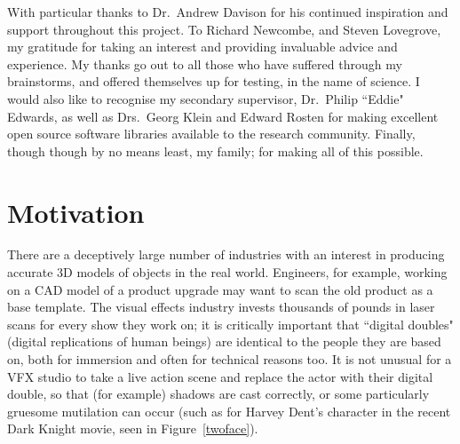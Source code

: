 \documentclass[a4paper,10pt]{article}
\begin{document}
\begin{acknowledgements}
With particular thanks to Dr.\ Andrew Davison for his continued inspiration and support throughout this project. To Richard Newcombe, and Steven Lovegrove, my gratitude for taking an interest and providing invaluable advice and experience. My thanks go out to all those who have suffered through my brainstorms, and offered themselves up for testing, in the name of science. I would also like to recognise my secondary supervisor, Dr.\ Philip ``Eddie" Edwards, as well as Drs.\ Georg Klein and Edward Rosten for making excellent open source software libraries available to the research community. Finally, though though by no means least, my family; for making all of this possible.
\end{acknowledgements}

\pagebreak
\tableofcontents
\pagebreak

\begingroup
\renewcommand*{\addvspace}[1]{}
\setlength{\cftbeforefigskip}{5px}
\listoffigures
\endgroup

\newpage
{}

\section{Motivation}
There are a deceptively large number of industries with an interest in producing accurate 3D models of objects in the real world. Engineers, for example, working on a CAD model of a product upgrade may want to scan the old product as a base template. The visual effects industry invests thousands of pounds in laser scans for every show they work on; it is critically important that ``digital doubles" (digital replications of human beings) are identical to the people they are based on, both for immersion and often for technical reasons too. It is not unusual for a VFX studio to take a live action scene and replace the actor with their digital double, so that (for example) shadows are cast correctly, or some particularly gruesome mutilation can occur (such as for Harvey Dent's character in the recent Dark Knight movie, seen in Figure~\ref{twoface}).
\end{document}
